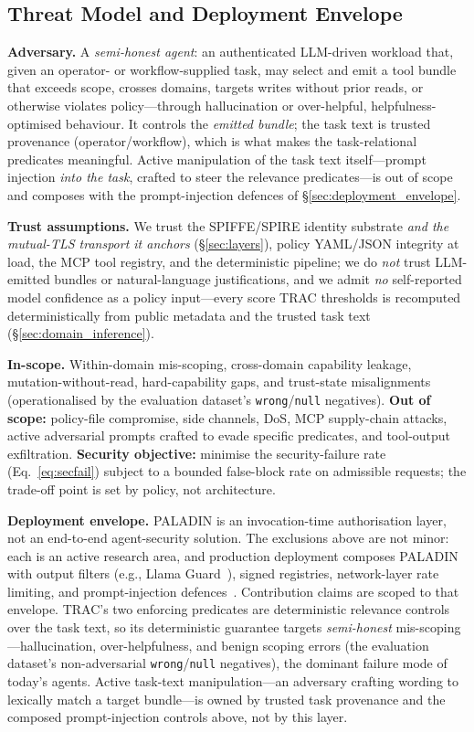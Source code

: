 \documentclass[sigconf,review,anonymous]{acmart}
\begin{document}
\subsection{Threat Model and Deployment Envelope}
\label{sec:threat_model}


\textbf{Adversary.} A \emph{semi-honest agent}: an authenticated LLM-driven workload that, given an operator- or workflow-supplied task, may select and emit a tool bundle that exceeds scope, crosses domains, targets writes without prior reads, or otherwise violates policy---through hallucination or over-helpful, helpfulness-optimised behaviour. It controls the \emph{emitted bundle}; the task text is trusted provenance (operator/workflow), which is what makes the task-relational predicates meaningful. Active manipulation of the task text itself---prompt injection \emph{into the task}, crafted to steer the relevance predicates---is out of scope and composes with the prompt-injection defences of \S\ref{sec:deployment_envelope}.

\textbf{Trust assumptions.} We trust the SPIFFE/SPIRE identity substrate \emph{and the mutual-TLS transport it anchors} (\S\ref{sec:layers}), policy YAML/JSON integrity at load, the MCP tool registry, and the deterministic pipeline; we do \emph{not} trust LLM-emitted bundles or natural-language justifications, and we admit \emph{no} self-reported model confidence as a policy input---every score TRAC thresholds is recomputed deterministically from public metadata and the trusted task text (\S\ref{sec:domain_inference}).

\textbf{In-scope.} Within-domain mis-scoping, cross-domain capability leakage, mutation-without-read, hard-capability gaps, and trust-state misalignments (operationalised by the evaluation dataset's \texttt{wrong}/\texttt{null} negatives). \textbf{Out of scope:} policy-file compromise, side channels, DoS, MCP supply-chain attacks, active adversarial prompts crafted to evade specific predicates, and tool-output exfiltration. \textbf{Security objective:} minimise the security-failure rate (Eq.~\ref{eq:secfail}) subject to a bounded false-block rate on admissible requests; the trade-off point is set by policy, not architecture.

\textbf{Deployment envelope.} PALADIN is an invocation-time authorisation layer, not an end-to-end agent-security solution. The exclusions above are not minor: each is an active research area, and production deployment composes PALADIN with output filters (e.g., Llama Guard~\cite{inan2023llamaguard}), signed registries, network-layer rate limiting, and prompt-injection defences~\cite{liu2024formalizing}. Contribution claims are scoped to that envelope. TRAC's two enforcing predicates are deterministic relevance controls over the task text, so its deterministic guarantee targets \emph{semi-honest} mis-scoping---hallucination, over-helpfulness, and benign scoping errors (the evaluation dataset's non-adversarial \texttt{wrong}/\texttt{null} negatives), the dominant failure mode of today's agents. Active task-text manipulation---an adversary crafting wording to lexically match a target bundle---is owned by trusted task provenance and the composed prompt-injection controls above, not by this layer.
\end{document}
